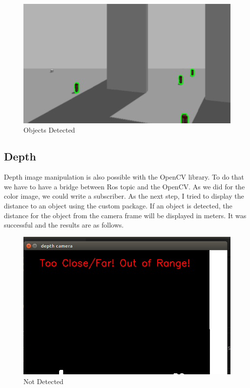 \documentclass[twoside,12pt,times,onecolumn,a4paper]{report}
\begin{document}
\begin{figure}[H]
  \centering
   \includegraphics[width=15cm]{detected}
  \caption{Objects Detected}
\end{figure}

\subsection{Depth}

Depth image manipulation is also possible with the OpenCV library. To do 
that we have to have a bridge between Ros topic and the OpenCV. As we did for the 
color image, we could write a subscriber. As the next step, I tried to display the 
distance to an object using the custom package. If an object is detected, the 
distance for the object from the camera frame will be displayed in meters. It was 
successful and the results are as follows.

\begin{figure}[H]
  \centering
   \includegraphics[width=15cm]{depth_output}
  \caption{Not Detected}
\end{figure}
\end{document}
